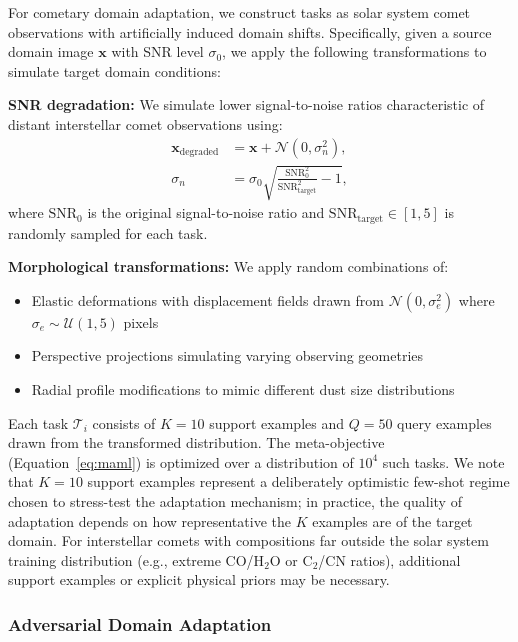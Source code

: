 \documentclass[preprint2]{aastex631}
\begin{document}
For cometary domain adaptation, we construct tasks as solar system comet observations with artificially induced domain shifts. Specifically, given a source domain image $\mathbf{x}$ with SNR level $\sigma_0$, we apply the following transformations to simulate target domain conditions:

\textbf{SNR degradation:} We simulate lower signal-to-noise ratios characteristic of distant interstellar comet observations using:
\begin{equation}\label{eq:snr_degradation}
\begin{split}
\mathbf{x}_{\text{degraded}} &= \mathbf{x} + \mathcal{N}(0, \sigma_n^2), \\
\sigma_n &= \sigma_0 \sqrt{\frac{\text{SNR}_0^2}{\text{SNR}_{\text{target}}^2} - 1},
\end{split}
\end{equation}
where $\text{SNR}_0$ is the original signal-to-noise ratio and $\text{SNR}_{\text{target}} \in [1, 5]$ is randomly sampled for each task.

\textbf{Morphological transformations:} We apply random combinations of:
\begin{itemize}
    \item Elastic deformations with displacement fields drawn from $\mathcal{N}(0, \sigma_e^2)$ where $\sigma_e \sim \mathcal{U}(1, 5)$ pixels
    \item Perspective projections simulating varying observing geometries
    \item Radial profile modifications to mimic different dust size distributions
\end{itemize}

Each task $\mathcal{T}_i$ consists of $K=10$ support examples and $Q=50$ query examples drawn from the transformed distribution. The meta-objective (Equation~\ref{eq:maml}) is optimized over a distribution of $10^4$ such tasks. We note that $K=10$ support examples represent a deliberately optimistic few-shot regime chosen to stress-test the adaptation mechanism; in practice, the quality of adaptation depends on how representative the $K$ examples are of the target domain. For interstellar comets with compositions far outside the solar system training distribution (e.g., extreme CO/H$_2$O or C$_2$/CN ratios), additional support examples or explicit physical priors may be necessary.

\subsubsection{Adversarial Domain Adaptation}
\end{document}
